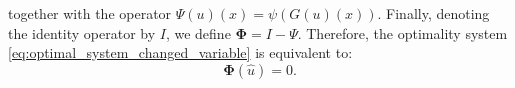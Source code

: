 \documentclass[11pt,a4paper]{amsart}
\renewcommand{\l}{\left}
\renewcommand{\r}{\right}
\newcommand{\om}{\Omega}
\newcommand{\ga}{\Gamma}
\newcommand{\sign}{\mathrm{sign}}
\newcommand{\norm}[1]{\lVert #1 \rVert}
\begin{document}
together with the operator $\Psi (u)(x)=\psi(G(u)(x))$. Finally, denoting the identity operator by $I$, we define $\mathbf{\Phi}=I-\Psi$. Therefore, the optimality system \eqref{eq:optimal_system_changed_variable} is equivalent to:
$$\mathbf{\Phi}(\hat u) =0.$$

\end{document}
